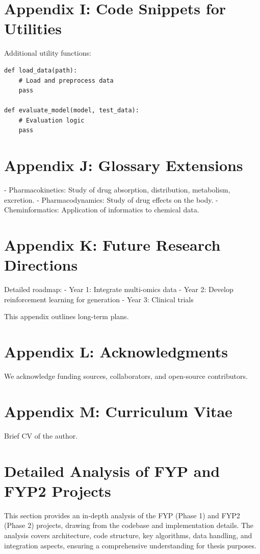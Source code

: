 \documentclass[12pt,a4paper]{article}
\begin{document}
\section{Appendix I: Code Snippets for Utilities}
Additional utility functions:

\begin{lstlisting}
def load_data(path):
    # Load and preprocess data
    pass

def evaluate_model(model, test_data):
    # Evaluation logic
    pass
\end{lstlisting}

\section{Appendix J: Glossary Extensions}
- Pharmacokinetics: Study of drug absorption, distribution, metabolism, excretion.
- Pharmacodynamics: Study of drug effects on the body.
- Cheminformatics: Application of informatics to chemical data.

\section{Appendix K: Future Research Directions}
Detailed roadmap:
- Year 1: Integrate multi-omics data
- Year 2: Develop reinforcement learning for generation
- Year 3: Clinical trials

This appendix outlines long-term plans.

\section{Appendix L: Acknowledgments}
We acknowledge funding sources, collaborators, and open-source contributors.

\section{Appendix M: Curriculum Vitae}
Brief CV of the author.

\section{Detailed Analysis of FYP and FYP2 Projects}
\label{sec:project_analysis}

This section provides an in-depth analysis of the FYP (Phase 1) and FYP2 (Phase 2) projects, drawing from the codebase and implementation details. The analysis covers architecture, code structure, key algorithms, data handling, and integration aspects, ensuring a comprehensive understanding for thesis purposes.
\end{document}
